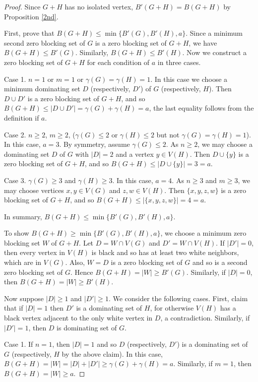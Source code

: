 \documentclass[10pt,a4paper]{amsart}
\begin{document}
\begin{proof}
Since $G+H$ has no isolated vertex, $B'(G+H)=B(G+H)$ by Proposition \ref{2nd}.

First, prove that $B(G+H)\le \min\{B'(G),B'(H),a\}$.
Since a minimum second zero blocking set of $G$ is
a zero blocking set of $G+H$, we have $B(G+H)\le B'(G)$.
Similarly, $B(G+H)\le B'(H)$.
Now we construct a zero blocking set of $G+H$ for each condition of $a$ in three cases.

Case 1. $n=1$ or $m=1$ or $\gamma(G)=\gamma(H)=1$.
In this case we choose
a minimum dominating set $D$ (respectively, $D'$) of $G$ (respectively, $H$).
Then $D\cup D'$ is a zero blocking set of $G+H$,
and so $B(G+H)\le |D\cup D'|= \gamma(G)+\gamma(H)=a$, 
the last equality follows from the definition if $a$.

Case 2. $n\ge 2$, $m\ge 2$,
($\gamma(G)\le 2$ or $\gamma(H)\le 2$ but not $\gamma(G)=\gamma(H)=1$).
In this case, $a=3$.
By symmetry, assume $\gamma(G)\le 2$.
As $n\ge 2$, we may choose
a dominating set $D$ of $G$ with $|D|=2$ and a vertex $y\in V(H)$.
Then $D\cup\{y\}$ is a zero blocking set of $G+H$,
and so $B(G+H)\le |D\cup\{y\}| = 3=a$.

Case 3. $\gamma(G)\ge 3$ and $\gamma(H)\ge 3$.
In this case, $a=4$. As $n\ge 3$ and $m\ge 3$, we may choose vertices $x,y\in V(G)$ and $z,w\in V(H)$.
Then $\{x,y,z,w\}$ is a zero blocking set of $G+H$, and so $B(G+H)\le |\{x,y,z,w\}|=4=a$.

In summary, $B(G+H)\le \min\{B'(G),B'(H),a\}$.

To show $B(G+H)\ge \min\{B'(G),B'(H),a\}$,
we choose a minimum zero blocking set $W$ of $G+H$.
Let $D=W\cap V(G)$ and $D'=W\cap V(H)$.
If $|D'|=0$, then every vertex in $V(H)$ is black and so has at least two white neighbors, which are in $V(G)$.
Also, $W=D$ is a zero blocking set of $G$ and so is a second zero blocking set of $G$.
Hence $ B(G+H) =  |W|\ge B'(G)$.
Similarly, if $|D|=0$, then $B(G+H) =  |W|\ge B'(H)$.

Now suppose $|D|\ge 1$ and $|D'|\ge 1$.
We consider the following cases. First, claim that if $|D|=1$ then $D'$ is a dominating set of $H$,
for otherwise $V(H)$ has a black vertex adjacent to the only white vertex in $D$,
a contradiction.
Similarly, if $|D'|=1$, then $D$ is dominating set of $G$.

Case 1.
If $n=1$, then $|D|=1$ and so $D$ (respectively, $D'$) is a dominating set of $G$ (respectively, $H$ by the above claim).
In this case, $ B(G+H) =  |W|=|D|+|D'|\ge \gamma(G)+\gamma(H)=a$.
Similarly, if $m=1$, then $ B(G+H) = |W|\ge a$.


\end{proof}
\end{document}
